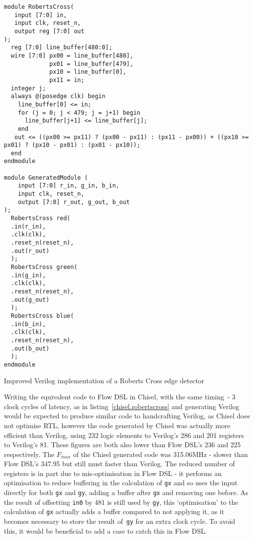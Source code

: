 \begin{listing}[H]
  \begin{verbatim}
module RobertsCross(
   input [7:0] in,
   input clk, reset_n,
   output reg [7:0] out
);
  reg [7:0] line_buffer[480:0];
  wire [7:0] px00 = line_buffer[480],
             px01 = line_buffer[479],
             px10 = line_buffer[0],
             px11 = in;
  integer j;
  always @(posedge clk) begin
    line_buffer[0] <= in;
    for (j = 0; j < 479; j = j+1) begin
      line_buffer[j+1] <= line_buffer[j];
    end
   out <= ((px00 >= px11) ? (px00 - px11) : (px11 - px00)) + ((px10 >= px01) ? (px10 - px01) : (px01 - px10));
  end
endmodule

module GeneratedModule (
    input [7:0] r_in, g_in, b_in,
    input clk, reset_n,
    output [7:0] r_out, g_out, b_out
);
  RobertsCross red(
  .in(r_in),
  .clk(clk),
  .reset_n(reset_n),
  .out(r_out)
  );
  RobertsCross green(
  .in(g_in),
  .clk(clk),
  .reset_n(reset_n),
  .out(g_out)
  );
  RobertsCross blue(
  .in(b_in),
  .clk(clk),
  .reset_n(reset_n),
  .out(b_out)
  );
endmodule
\end{verbatim}
  \caption{Improved Verilog implementation of a Roberts Cross edge detector}\label{verilog.roberts_cross.improved}
\end{listing}

Writing the equivalent code to Flow DSL in Chisel, with the same timing \hyphen{} 3 clock cycles of latency, as in listing \ref{chisel.robertscross} and generating Verilog would be expected to produce similar code to handcrafting Verilog, as Chisel does not optimise RTL, however the code generated by Chisel was actually more efficient than Verilog, using 232 logic elements to Verilog's 286 and 201 registers to Verilog's 81. These figures are both also lower than Flow DSL's 236 and 225 respectively. The $F_{max}$ of the Chisel generated code was 315.06MHz \hyphen{} slower than Flow DSL's 347.95 but still must faster than Verilog. The reduced number of registers is in part due to mis-optimisation in Flow DSL \hyphen{} it performs an optimisation to reduce buffering in the calculation of \lstinline|gx| and so uses the input directly for both \lstinline|gx| and \lstinline|gy|, adding a buffer after \lstinline|gx| and removing one before. As the result of offsetting \lstinline|in0| by 481 is still used by \lstinline|gy|, this `optimisation' to the calculation of \lstinline|gx| actually adds a buffer compared to not applying it, as it becomes necessary to store the result of \lstinline|gy| for an extra clock cycle. To avoid this, it would be beneficial to add a case to catch this in Flow DSL.

